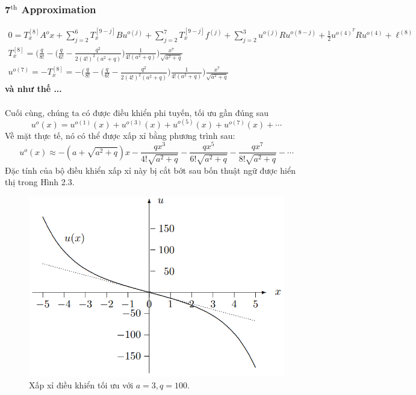 \documentclass[12pt,a4paper]{report}
\begin{document}
\subsubsection{\textbf{7}$^{\text{th}}$ Approximation}
\begin{align}
	0=T_x^{[8]}A^ox + \sum_{j=2}^{6}T_x^{[9-j]}Bu^{o(j)} + \sum_{j=2}^{7}T_x^{[9-j]}f^{(j)} + \sum_{j=2}^{3}u^{o(j)}Ru^{o(8-j)}+\frac{1}{2}u^{o(4)^T}Ru^{o(4)} + \ell^{(8)} \nonumber \\ T_x^{[8]} = \bigg(\frac{q}{8!} - \Big(\frac{q}{6!}-\frac{q^2}{2(4!)^2(a^2+q)}\Big)\frac{1}{4!(a^2+q)}\bigg)\frac{x^7}{\sqrt{a^2+q}} \nonumber \\ u^{o(7)} = -T_x^{[8]} = -\bigg(\frac{q}{8!} - \Big(\frac{q}{6!}-\frac{q^2}{2(4!)^2(a^2+q)}\Big)\frac{1}{4!(a^2+q)}\bigg)\frac{x^7}{\sqrt{a^2+q}} \nonumber
\end{align}
\textbf{và như thế ...} \\\\Cuối cùng, chúng ta có được điều khiển phi tuyến, tối ưu gần đúng sau $$u^o(x) = u^{o(1)}(x) + u^{o(3)}(x) + u^{o(5)}(x) + u^{o(7)}(x) + \cdots $$ Về mặt thực tế, nó có thể được xấp xỉ bằng phương trình sau: $$u^o(x) \approx -(a+\sqrt{a^2 + q})x - 
\frac{qx^3}{4!\sqrt{a^2+q}} - \frac{qx^5}{6!\sqrt{a^2+q}} - \frac{qx^7}{8!\sqrt{a^2+q}}-\cdots$$ Đặc tính của bộ điều khiển xấp xỉ này bị cắt bớt sau bốn thuật ngữ được hiển thị trong Hình 2.3.
\begin{figure}[h]
	\centering
	\includegraphics[scale=.6]{hinh5.png}
	\caption{Xấp xỉ điều khiển tối ưu với $a = 3, q = 100$.}
\end{figure}
\end{document}
